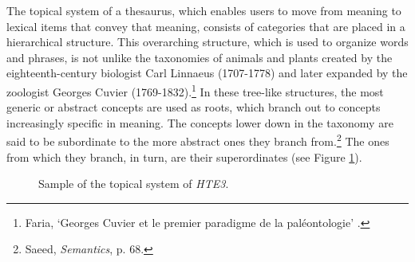 The topical system of a thesaurus, which enables users to move from meaning to lexical items that convey that meaning, consists of categories that are placed in a hierarchical structure. This overarching structure, which is used to organize words and phrases, is not unlike the taxonomies of animals and plants created by the eighteenth-century biologist Carl Linnaeus (1707-1778) and later expanded by the zoologist Georges Cuvier (1769-1832).\footnote{Faria, `Georges Cuvier et le premier paradigme de la paléontologie'%
.} 
In these tree-like structures, the most generic or abstract concepts are used as roots, which branch out to concepts increasingly specific in meaning. The concepts lower down in the taxonomy are said to be subordinate to the more abstract ones they branch from.\footnote{%
Saeed, \textit{Semantics}, %
p. 68.} The ones from which they branch, in turn, are their superordinates (see Figure \ref{fig:Stolk_thes-content:HTE-ts-explained}).

\begin{figure}[h]
	\framebox[\textwidth]{
		\scalebox{0.65}[0.65]{
		    
		}
	}
	\caption[]{\label{fig:Stolk_thes-content:HTE-ts-explained} Sample of the topical system of \textit{HTE3}.}
\end{figure}


